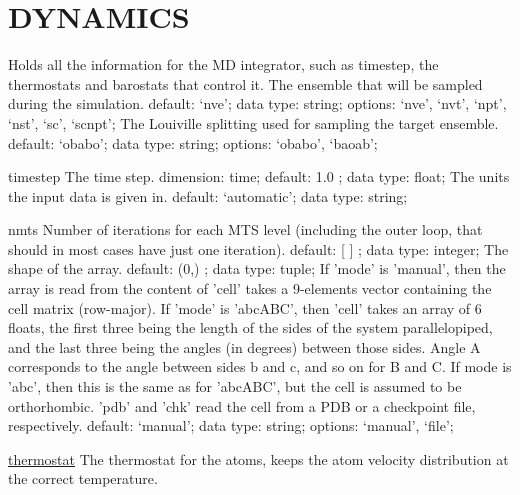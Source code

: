 \section{DYNAMICS}
\label{DYNAMICS}
\begin{ipifield}{}%
{Holds all the information for the MD integrator, such as timestep, the thermostats and barostats that control it.}%
{}%
{%
{The ensemble that will be sampled during the simulation. }%
{default: `nve'; data type: string; options: `nve', `nvt', `npt', `nst', `sc', `scnpt'; }%
%
{The Louiville splitting used for sampling the target ensemble. }%
{default: `obabo'; data type: string; options: `obabo', `baoab'; }%
}
\begin{ipifield}{timestep}%
{The time step.}%
{dimension: time; default:  1.0 ; data type: float; }%
{%
{The units the input data is given in.}%
{default: `automatic'; data type: string; }%
}
\end{ipifield}
\begin{ipifield}{nmts}%
{Number of iterations for each MTS level (including the outer loop, that should in most cases have just one iteration).}%
{default:  [ ] ; data type: integer; }%
{%
{The shape of the array.}%
{default:  (0,) ; data type: tuple; }%
%
{If 'mode' is 'manual', then the array is read from the content of 'cell' takes a 9-elements vector containing the cell matrix (row-major). If 'mode' is 'abcABC', then 'cell' takes an array of 6 floats, the first three being the length of the sides of the system parallelopiped, and the last three being the angles (in degrees) between those sides. Angle A corresponds to the angle between sides b and c, and so on for B and C. If mode is 'abc', then this is the same as for 'abcABC', but the cell is assumed to be orthorhombic. 'pdb' and 'chk' read the cell from a PDB or a checkpoint file, respectively.}%
{default: `manual'; data type: string; options: `manual', `file'; }%
}
\end{ipifield}
\begin{ipifield}{\hyperref[THERMOSTATS]{thermostat}}%
{The thermostat for the atoms, keeps the atom velocity distribution at the correct temperature.}%
{}%
{%
}
\end{ipifield}
\end{ipifield}
